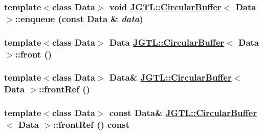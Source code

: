 \hypertarget{class_j_g_t_l_1_1_circular_buffer_1f74d2cd67aa2c9db0b2ca389313dcff}{
\subsubsection[enqueue]{\setlength{\rightskip}{0pt plus 5cm}template$<$class Data$>$ void \hyperlink{class_j_g_t_l_1_1_circular_buffer}{JGTL::Circular\-Buffer}$<$ Data $>$::enqueue (const Data \& {\em data})}}
\label{class_j_g_t_l_1_1_circular_buffer_1f74d2cd67aa2c9db0b2ca389313dcff}


\hypertarget{class_j_g_t_l_1_1_circular_buffer_a428dabc69ba27d87402edeac3f45df9}{
\subsubsection[front]{\setlength{\rightskip}{0pt plus 5cm}template$<$class Data$>$ Data \hyperlink{class_j_g_t_l_1_1_circular_buffer}{JGTL::Circular\-Buffer}$<$ Data $>$::front ()}}
\label{class_j_g_t_l_1_1_circular_buffer_a428dabc69ba27d87402edeac3f45df9}


\hypertarget{class_j_g_t_l_1_1_circular_buffer_22ac3344de0e92167193f4133156c117}{
\subsubsection[frontRef]{\setlength{\rightskip}{0pt plus 5cm}template$<$class Data$>$ Data\& \hyperlink{class_j_g_t_l_1_1_circular_buffer}{JGTL::Circular\-Buffer}$<$ Data $>$::front\-Ref ()}}
\label{class_j_g_t_l_1_1_circular_buffer_22ac3344de0e92167193f4133156c117}


\hypertarget{class_j_g_t_l_1_1_circular_buffer_1fc217fbac47f045aeb79de7a98bf6fb}{
\subsubsection[frontRef]{\setlength{\rightskip}{0pt plus 5cm}template$<$class Data$>$ const Data\& \hyperlink{class_j_g_t_l_1_1_circular_buffer}{JGTL::Circular\-Buffer}$<$ Data $>$::front\-Ref () const}}
\label{class_j_g_t_l_1_1_circular_buffer_1fc217fbac47f045aeb79de7a98bf6fb}


